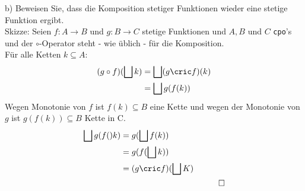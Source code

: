 \documentclass[ngerman,a4paper]{report}
\begin{document}
\begin{compactenum}
\item[b)] Beweisen Sie, dass die Komposition stetiger Funktionen wieder eine stetige Funktion ergibt.\\
Skizze: Seien $f : A \rightarrow B$ und $g : B \rightarrow C$ stetige Funktionen und $A, B$ und $C$ \lstinline!cpo!'s und der $\circ$-Operator steht - wie üblich - für die Komposition.\\
Für alle Ketten $k \subseteq A$:
\begin{align*}
(g \circ f) (\bigsqcup k) &= \bigsqcup (g \cric f) (k) \\
&= \bigsqcup g (f (k)) \\
\end{align*}
Wegen Monotonie von $f$ ist $f(k) \subseteq B$ eine Kette und wegen der Monotonie von $g$ ist $g(f(k)) \subseteq B$ Kette in C.
\begin{align*}
\bigsqcup g (f()k) &= g (\bigsqcup f(k))\\
&= g (f (\bigsqcup k))\\
&= (g \cric f) (\bigsqcup K)\\
&& \qed\\
\end{align*}
\end{compactenum}
\end{document}
